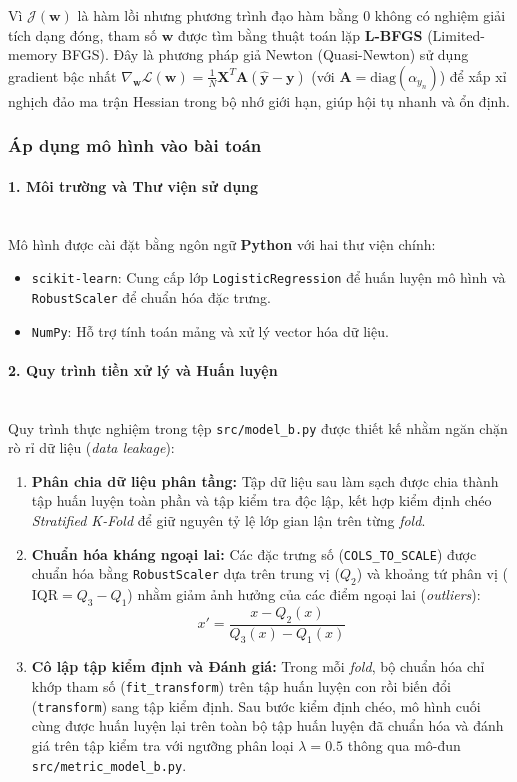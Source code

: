 Vì $\mathcal{J}(\mathbf{w})$ là hàm lồi nhưng phương trình đạo hàm bằng $0$ không có nghiệm giải tích dạng đóng, tham số $\mathbf{w}$ được tìm bằng thuật toán lặp \textbf{L-BFGS} (Limited-memory BFGS). Đây là phương pháp giả Newton (Quasi-Newton) sử dụng gradient bậc nhất $\nabla_{\mathbf{w}}\mathcal{L}(\mathbf{w}) = \frac{1}{N}\mathbf{X}^T \mathbf{A} (\hat{\mathbf{y}} - \mathbf{y})$ (với $\mathbf{A} = \text{diag}(\alpha_{y_n})$) để xấp xỉ nghịch đảo ma trận Hessian trong bộ nhớ giới hạn, giúp hội tụ nhanh và ổn định.

\subsubsection{Áp dụng mô hình vào bài toán}

\paragraph{1. Môi trường và Thư viện sử dụng}\mbox{}\\
Mô hình được cài đặt bằng ngôn ngữ \textbf{Python} với hai thư viện chính:
\begin{itemize}
    \item \texttt{scikit-learn}: Cung cấp lớp \texttt{LogisticRegression} để huấn luyện mô hình và \texttt{RobustScaler} để chuẩn hóa đặc trưng.
    \item \texttt{NumPy}: Hỗ trợ tính toán mảng và xử lý vector hóa dữ liệu.
\end{itemize}

\paragraph{2. Quy trình tiền xử lý và Huấn luyện}\mbox{}\\
Quy trình thực nghiệm trong tệp \texttt{src/model\_b.py} được thiết kế nhằm ngăn chặn rò rỉ dữ liệu (\textit{data leakage}):
\begin{enumerate}
    \item \textbf{Phân chia dữ liệu phân tầng:} Tập dữ liệu sau làm sạch được chia thành tập huấn luyện toàn phần và tập kiểm tra độc lập, kết hợp kiểm định chéo \textit{Stratified K-Fold} để giữ nguyên tỷ lệ lớp gian lận trên từng \textit{fold}.
    \item \textbf{Chuẩn hóa kháng ngoại lai:} Các đặc trưng số (\texttt{COLS\_TO\_SCALE}) được chuẩn hóa bằng \texttt{RobustScaler} dựa trên trung vị ($Q_2$) và khoảng tứ phân vị ($\text{IQR} = Q_3 - Q_1$) nhằm giảm ảnh hưởng của các điểm ngoại lai (\textit{outliers}):
    \begin{equation}
        x' = \frac{x - Q_2(x)}{Q_3(x) - Q_1(x)}
    \end{equation}
    \item \textbf{Cô lập tập kiểm định và Đánh giá:} Trong mỗi \textit{fold}, bộ chuẩn hóa chỉ khớp tham số (\texttt{fit\_transform}) trên tập huấn luyện con rồi biến đổi (\texttt{transform}) sang tập kiểm định. Sau bước kiểm định chéo, mô hình cuối cùng được huấn luyện lại trên toàn bộ tập huấn luyện đã chuẩn hóa và đánh giá trên tập kiểm tra với ngưỡng phân loại $\lambda = 0.5$ thông qua mô-đun \texttt{src/metric\_model\_b.py}.
\end{enumerate}

